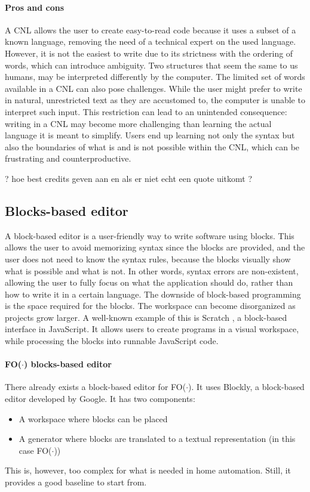 \documentclass[11pt,a4paper]{report}
\newcommand{\fodot}{FO($\cdot$)\xspace}
\begin{document}
\paragraph{Pros and cons}
A CNL allows the user to create easy-to-read code because it uses a subset of a known language, removing the need of a technical expert on the used language. However, it is not the easiest to write due to its strictness with the ordering of words, which can introduce ambiguity. Two structures that seem the same to us humans, may be interpreted differently by the computer. The limited set of words available in a CNL can also pose challenges. While the user might prefer to write in natural, unrestricted text as they are accustomed to, the computer is unable to interpret such input. This restriction can lead to an unintended consequence: writing in a CNL may become more challenging than learning the actual language it is meant to simplify. Users end up learning not only the syntax but also the boundaries of what is and is not possible within the CNL, which can be frustrating and counterproductive.

? hoe best credits geven aan \cite{IDPSimplifyingKnowledgeBase} en \cite{CNLAttemptoControlledEnglish} als er niet echt een quote uitkomt ?

\subsection{Blocks-based editor}
A block-based editor is a user-friendly way to write software using blocks. This allows the user to avoid memorizing syntax since the blocks are provided, and the user does not need to know the syntax rules, because the blocks visually show what is possible and what is not. In other words, syntax errors are non-existent, allowing the user to fully focus on what the application should do, rather than how to write it in a certain language. The downside of block-based programming is the space required for the blocks. The workspace can become disorganized as projects grow larger. A well-known example of this is Scratch \cite{scratch}, a block-based interface in JavaScript. It allows users to create programs in a visual workspace, while processing the blocks into runnable JavaScript code.

\paragraph{\fodot blocks-based editor}
There already exists a block-based editor for \fodot \cite{IDPStructuredBlockbasedEditor}. It uses Blockly, a block-based editor developed by Google. It has two components:
\begin{itemize}
	\item A workspace where blocks can be placed
	\item A generator where blocks are translated to a textual representation (in this case \fodot)
\end{itemize}
This is, however, too complex for what is needed in home automation. Still, it provides a good baseline to start from.
\end{document}
